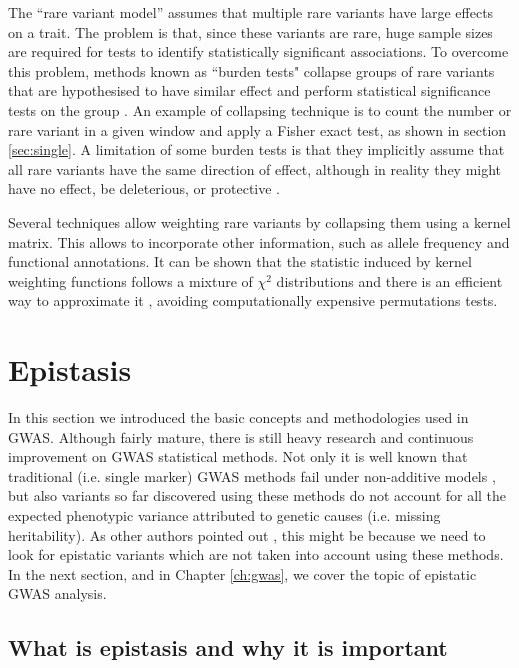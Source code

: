 The ``rare variant model'' assumes that multiple rare variants have large effects on a trait. The problem is that, since these variants are rare, huge sample sizes are required for tests to identify statistically significant associations. To overcome this problem, methods known as ``burden tests" collapse groups of rare variants that are hypothesised to have  similar effect and perform statistical significance tests on the group \cite{li2008methods}. An example of collapsing technique is to count the number or rare variant in a given window and apply a Fisher exact test, as shown in section \ref{sec:single}. A limitation of some burden tests is that they implicitly assume that all rare variants have the same direction of effect, although in reality they might have no effect, be deleterious, or protective \cite{li2008methods,wu2011rare}.

Several techniques allow weighting rare variants by collapsing them using a kernel matrix. This allows to incorporate other information, such as allele frequency and functional annotations. It can be shown that the statistic induced by kernel weighting functions follows a mixture of $\chi^2$ distributions and there is an efficient way to approximate it \cite{li2008methods,wu2011rare}, avoiding computationally expensive permutations tests.

\section{Epistasis \label{sec:epi}}

In this section we introduced the basic concepts and methodologies used in GWAS. Although fairly mature, there is still heavy research and continuous improvement on GWAS statistical methods. Not only it is well known that traditional (i.e. single marker) GWAS methods fail under non-additive models \cite{culverhouse2002perspective}, but also variants so far discovered using these methods do not account for all the expected phenotypic variance attributed to genetic causes (i.e. missing heritability). As other authors pointed out \cite{cordell2009detecting, zuk2012mystery, zuk2014searching}, this might be because we need to look for epistatic variants which are not taken into account using these methods. In the next section, and in Chapter \ref{ch:gwas}, we cover the topic of epistatic GWAS analysis.

\subsection{What is epistasis and why it is important}

